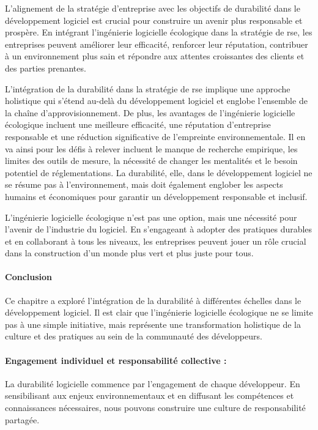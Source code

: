 L'alignement de la stratégie d'entreprise avec les objectifs de durabilité dans le développement logiciel est crucial pour construire un avenir plus responsable et prospère. En intégrant l'ingénierie logicielle écologique dans la stratégie de \acrshort{rse}, les entreprises peuvent améliorer leur efficacité, renforcer leur réputation, contribuer à un environnement plus sain et répondre aux attentes croissantes des clients et des parties prenantes.


L'intégration de la durabilité dans la stratégie de \acrshort{rse} implique une approche holistique qui s'étend au-delà du développement logiciel et englobe l'ensemble de la chaîne d'approvisionnement. De plus, les avantages de l'ingénierie logicielle écologique incluent une meilleure efficacité, une réputation d'entreprise responsable et une réduction significative de l'empreinte environnementale. Il en va ainsi pour les défis à relever incluent le manque de recherche empirique, les limites des outils de mesure, la nécessité de changer les mentalités et le besoin potentiel de réglementations. La durabilité, elle, dans le développement logiciel ne se résume pas à l'environnement, mais doit également englober les aspects humains et économiques pour garantir un développement responsable et inclusif.


L'ingénierie logicielle écologique n'est pas une option, mais une nécessité pour l'avenir de l'industrie du logiciel. En s'engageant à adopter des pratiques durables et en collaborant à tous les niveaux, les entreprises peuvent jouer un rôle crucial dans la construction d'un monde plus vert et plus juste pour tous.

\paragraph{Conclusion}
Ce chapitre a exploré l'intégration de la durabilité à différentes échelles dans le développement logiciel. Il est clair que l'ingénierie logicielle écologique ne se limite pas à une simple initiative, mais représente une transformation holistique de la culture et des pratiques au sein de la communauté des développeurs.

\paragraph{Engagement individuel et responsabilité collective :} La durabilité logicielle commence par l'engagement de chaque développeur. En sensibilisant aux enjeux environnementaux et en diffusant les compétences et connaissances nécessaires, nous pouvons construire une culture de responsabilité partagée.

